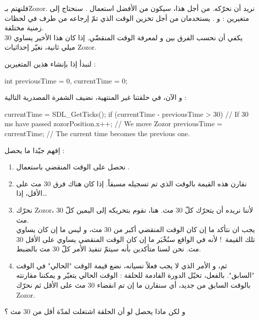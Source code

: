 فلنهتم بـ\textenglish{Zozor}.
نريد أن نحرّكه. من أجل هذا، سيكون من الأفضل استعمال 
.
سنحتاج إلى متغيرين : 
و 
.
يستخدمان من أجل تخزين الوقت الذي تمّ إرجاعه من طرف 
في لحظات زمنية مختلفة.\\
يكفي أن نحسب الفرق بين 
و
لمعرفة الوقت المنقضّي. إذا كان هذا الأخير يساوي 30 ميلي ثانية، نغيّر إحداثيات 
\textenglish{Zozor}.

لنبدأ إذا بإنشاء هذين المتغيرين  :

\begin{Csource}
int previousTime = 0, currentTime = 0;
\end{Csource}

و الآن، في حلقتنا غير المنتهية، نضيف الشفرة المصدرية التالية :

\begin{Csource}
currentTime = SDL_GetTicks();
if (currentTime - previousTime > 30) // If 30 ms have passed
{
	zozorPosition.x++; // We move Zozor
	previousTime = currentTime; // The current time becomes the previous one.
}
\end{Csource}

اِفهم جيّدا ما يحصل :

\begin{enumerate}
	\item نحصل على الوقت المنقضي باستعمال
	.
	\item نقارن هذه القيمة بالوقت الذي تم تسجيله مسبقاً. إذا كان هناك فرق 30 مث على الأقل، إذا\dots
	\item نحرّك
	\textenglish{Zozor}،
	لأننا نريده أن يتحرّك كلّ 30 مث. هنا، نقوم بتحريكه إلى اليمين كلّ 30 مث. \\
	يجب ان نتأكد ما إن كان الوقت المنقضي أكبر من 30 مث، و ليس ما إن كان يساوي تلك القيمة~! لأنه في الواقع سنُخْبَر ما إن كان الوقت المنقضي يساوي على الأقل 30 مث. نحن لسنا متأكدين بأنه سيتمّ تنفيذ الأمر كلّ 30 مث بالضبط.
	\item ثم، و الأمر الذي لا يجب فعلاً نسيانه، نضع قيمة الوقت "الحالي" في الوقت "السابق". بالفعل، تخيّل الدورة القادمة للحلقة : الوقت الحالي يتغيّر و يمكننا مقارنته بالوقت السابق من جديد، أي سنقارن ما إن تم انقضاء 30 مث على الأقل ثم نحرّك
	\textenglish{Zozor}.
\end{enumerate}

\begin{question}
و لكن ماذا يحصل لو أن الحلقة اشتغلت لمدّة أقل من 30 مث ؟
\end{question}

